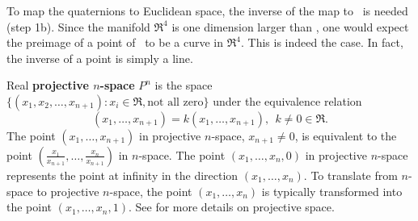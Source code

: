 To map the quaternions to Euclidean space,
the inverse of the map to \ is needed (step 1b).
Since the manifold $\Re^4$ is one dimension larger than , 
one would expect the preimage of a point of \ to be 
a curve in $\Re^4$.
This is indeed the case.
In fact, the inverse of a point is simply a line.
%
\begin{defn2}
\label{defn:projspace}
Real {\bf projective $n$-space} $P^n$ is the space 
$\{ (x_1,x_2,\ldots,x_{n+1}) : x_i \in \Re, \mbox{not all zero} \}$
under the equivalence relation 
\begin{equation}
\label{eq:projequivalence}
(x_1,\ldots,x_{n+1}) = k(x_1,\ldots,x_{n+1}),\ \ k \neq 0 \in \Re.
\end{equation}
The point $(x_1,\ldots,x_{n+1})$ in projective $n$-space, $x_{n+1} \neq 0$,
is equivalent to the point $(\frac{x_1}{x_{n+1}},\ldots,\frac{x_n}{x_{n+1}})$
in $n$-space.
The point $(x_1,\ldots,x_n,0)$ in projective $n$-space represents the point
at infinity in the direction $(x_1,\ldots,x_n)$.
To translate from $n$-space to projective $n$-space, the point 
$(x_1,\ldots,x_n)$ is typically transformed into the point $(x_1,\ldots,x_n,1)$.
See \cite{harris92} for more details on projective space.
\end{defn2}

